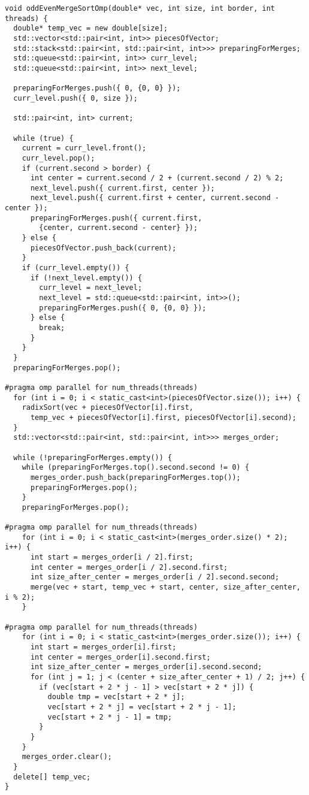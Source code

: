 \documentclass{report}
\begin{document}
\begin{lstlisting}
void oddEvenMergeSortOmp(double* vec, int size, int border, int threads) {
  double* temp_vec = new double[size];
  std::vector<std::pair<int, int>> piecesOfVector;
  std::stack<std::pair<int, std::pair<int, int>>> preparingForMerges;
  std::queue<std::pair<int, int>> curr_level;
  std::queue<std::pair<int, int>> next_level;

  preparingForMerges.push({ 0, {0, 0} });
  curr_level.push({ 0, size });

  std::pair<int, int> current;

  while (true) {
    current = curr_level.front();
    curr_level.pop();
    if (current.second > border) {
      int center = current.second / 2 + (current.second / 2) % 2;
      next_level.push({ current.first, center });
      next_level.push({ current.first + center, current.second - center });
      preparingForMerges.push({ current.first,
        {center, current.second - center} });
    } else {
      piecesOfVector.push_back(current);
    }
    if (curr_level.empty()) {
      if (!next_level.empty()) {
        curr_level = next_level;
        next_level = std::queue<std::pair<int, int>>();
        preparingForMerges.push({ 0, {0, 0} });
      } else {
        break;
      }
    }
  }
  preparingForMerges.pop();

#pragma omp parallel for num_threads(threads)
  for (int i = 0; i < static_cast<int>(piecesOfVector.size()); i++) {
    radixSort(vec + piecesOfVector[i].first,
      temp_vec + piecesOfVector[i].first, piecesOfVector[i].second);
  }
  std::vector<std::pair<int, std::pair<int, int>>> merges_order;

  while (!preparingForMerges.empty()) {
    while (preparingForMerges.top().second.second != 0) {
      merges_order.push_back(preparingForMerges.top());
      preparingForMerges.pop();
    }
    preparingForMerges.pop();

#pragma omp parallel for num_threads(threads)
    for (int i = 0; i < static_cast<int>(merges_order.size() * 2); i++) {
      int start = merges_order[i / 2].first;
      int center = merges_order[i / 2].second.first;
      int size_after_center = merges_order[i / 2].second.second;
      merge(vec + start, temp_vec + start, center, size_after_center, i % 2);
    }

#pragma omp parallel for num_threads(threads)
    for (int i = 0; i < static_cast<int>(merges_order.size()); i++) {
      int start = merges_order[i].first;
      int center = merges_order[i].second.first;
      int size_after_center = merges_order[i].second.second;
      for (int j = 1; j < (center + size_after_center + 1) / 2; j++) {
        if (vec[start + 2 * j - 1] > vec[start + 2 * j]) {
          double tmp = vec[start + 2 * j];
          vec[start + 2 * j] = vec[start + 2 * j - 1];
          vec[start + 2 * j - 1] = tmp;
        }
      }
    }
    merges_order.clear();
  }
  delete[] temp_vec;
}
\end{lstlisting}
\end{document}
